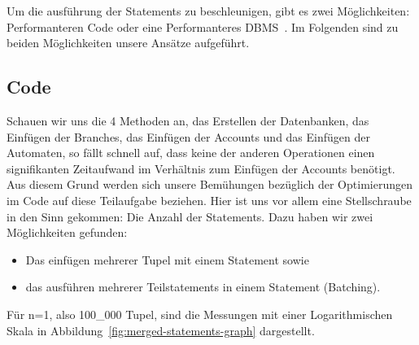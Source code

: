 Um die ausführung der Statements zu beschleunigen, gibt es zwei Möglichkeiten:
Performanteren Code oder eine Performanteres DBMS~.
Im Folgenden sind zu beiden Möglichkeiten unsere Ansätze aufgeführt.

\subsection{Code}\label{subsec:code}
Schauen wir uns die 4 Methoden an, das Erstellen der Datenbanken, das Einfügen der Branches, das Einfügen der Accounts und das Einfügen der Automaten, so fällt schnell auf, dass keine der anderen Operationen einen signifikanten Zeitaufwand im Verhältnis zum Einfügen der Accounts benötigt.
Aus diesem Grund werden sich unsere Bemühungen bezüglich der Optimierungen im Code auf diese Teilaufgabe beziehen.
Hier ist uns vor allem eine Stellschraube in den Sinn gekommen:
Die Anzahl der Statements.
Dazu haben wir zwei Möglichkeiten gefunden:
\begin{itemize}
    \item Das einfügen mehrerer Tupel mit einem Statement sowie
    \item das ausführen mehrerer Teilstatements in einem Statement (Batching).
\end{itemize}
Für n=1, also 100\_000 Tupel, sind die Messungen mit einer Logarithmischen Skala in Abbildung~\ref{fig:merged-statements-graph} dargestellt.
